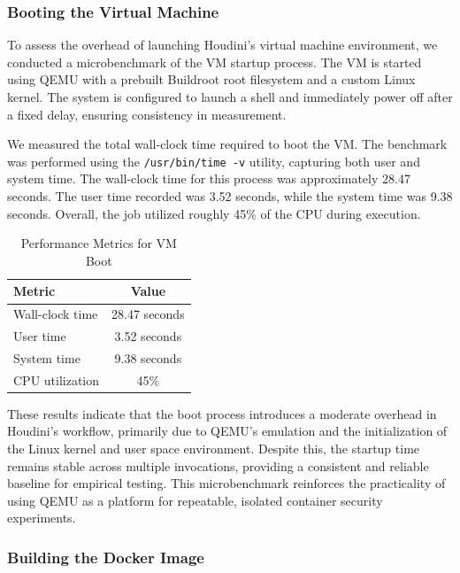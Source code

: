 \documentclass[12pt]{report}
\begin{document}
\begin{doublespace}
\subsubsection{Booting the Virtual Machine}

To assess the overhead of launching Houdini’s virtual machine environment, we conducted a microbenchmark of the VM startup process. The VM is started using QEMU with a prebuilt Buildroot root filesystem and a custom Linux kernel. The system is configured to launch a shell and immediately power off after a fixed delay, ensuring consistency in measurement.

We measured the total wall-clock time required to boot the VM. The benchmark was performed using the \texttt{/usr/bin/time -v} utility, capturing both user and system time. The wall-clock time for this process was approximately 28.47 seconds. The user time recorded was 3.52 seconds, while the system time was 9.38 seconds. Overall, the job utilized roughly 45\% of the CPU during execution.

\begin{table}[h]
\centering
\caption{Performance Metrics for VM Boot}
\label{tab:vm-boot-performance}
\begin{tabular}{|l|c|}
\hline
\textbf{Metric}         & \textbf{Value} \\
\hline
Wall-clock time         & 28.47 seconds \\
User time               & 3.52 seconds \\
System time             & 9.38 seconds \\
CPU utilization         & 45\% \\
\hline
\end{tabular}
\end{table}

These results indicate that the boot process introduces a moderate overhead in Houdini’s workflow, primarily due to QEMU’s emulation and the initialization of the Linux kernel and user space environment. Despite this, the startup time remains stable across multiple invocations, providing a consistent and reliable baseline for empirical testing. This microbenchmark reinforces the practicality of using QEMU as a platform for repeatable, isolated container security experiments.


\subsubsection{Building the Docker Image}


\end{doublespace}
\end{document}
